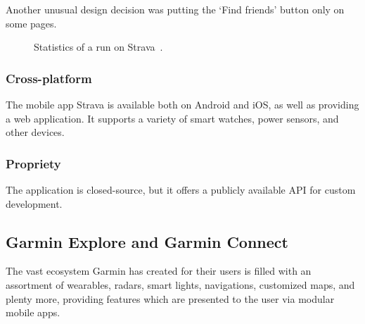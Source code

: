 Another unusual design decision was putting the `Find friends' button only on some pages.

\begin{figure}[h]
    \centering
    \caption{Statistics of a run on Strava~\cite{strava-run-stats-img}.}
    \label{strava-run-stats-img}
\end{figure}

\subsubsection*{Cross-platform}
The mobile app Strava is available both on Android and iOS, as well as providing a web application.
It supports a variety of smart watches, power sensors, and other devices.
\subsubsection*{Propriety}
The application is closed-source, but it offers a publicly available API for custom development.
\subsection{Garmin Explore and Garmin Connect}
The vast ecosystem Garmin has created for their users is filled with an assortment of wearables, radars, smart lights, navigations, customized maps, and plenty more, providing features which are presented to the user via modular mobile apps.

